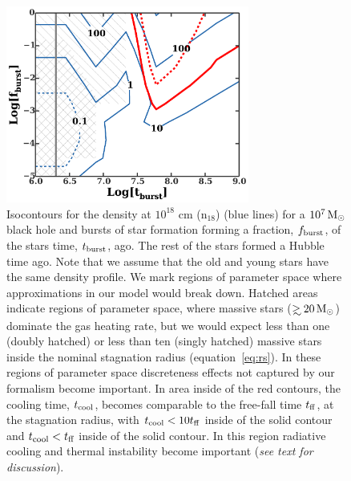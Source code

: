 \documentclass[usenatbib,fleqn]{mnras}
\newcommand\gsim{\mathrel{\rlap{\lower4pt\hbox{\hskip1pt$\sim$}}
    \raise1pt\hbox{$>$}}}
\newcommand{\Msun}{{\rm M_\odot}}
\begin{document}
\begin{figure} 
  \includegraphics[width=8cm]{cnm_plot.pdf}
  \caption{\label{fig:param} Isocontours for the density at $10^{18}$
    cm ($\mathrm{n_{18}}$) (blue lines) for a $10^{7} \, \Msun$
    black hole and bursts of star formation forming a fraction,
    $f_{\rm burst}$, of the stars time, $t_{\rm burst}$, ago. The rest
    of the stars formed a Hubble time ago. Note that we assume that
    the old and young stars have the same density profile. We mark
    regions of parameter space where approximations in our model would
    break down. Hatched areas indicate regions of parameter space,
    where massive stars ($\gsim 20 \, \Msun$) dominate the gas heating
    rate, but we would expect less than one (doubly hatched) or less
    than ten (singly hatched) massive stars inside the nominal
    stagnation radius (equation~\eqref{eq:rs}). In these regions of
    parameter space discreteness effects not captured by our formalism
    become important. In area inside of the red contours, the cooling
    time, $t_{\rm cool}$, becomes comparable to the free-fall time
    $t_{\rm ff}$, at the stagnation radius, with $t_{\rm cool}<10
    t_{\rm ff}$ inside of the solid contour and $t_{\rm cool}< t_{\rm
      ff}$ inside of the solid contour. In this region radiative
    cooling and thermal instability become important (\textit{see text
      for discussion}).}
\end{figure}
\end{document}
